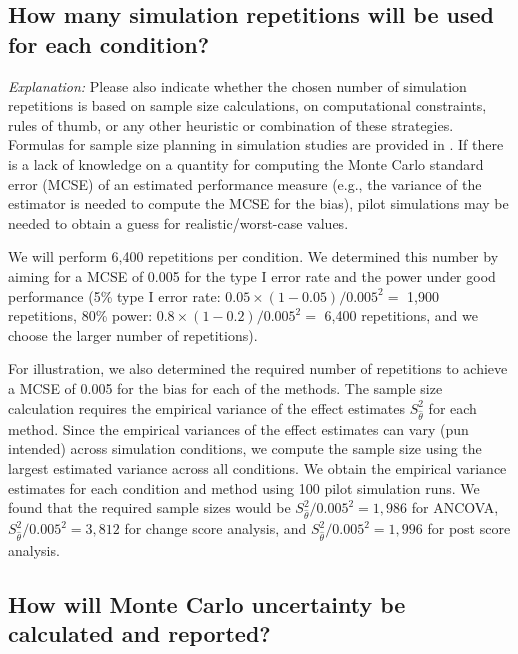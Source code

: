 \documentclass[12pt]{article}
\begin{document}
   
\subsection{How many simulation repetitions will be used for each condition?}  

\textit{Explanation:} Please also indicate whether the chosen number of simulation repetitions is based on sample size calculations, on computational constraints, rules of thumb, or any other heuristic or combination of these strategies. Formulas for sample size planning in simulation studies are provided in \textcite{Siepe2023}. If there is a lack of knowledge on a quantity for computing the Monte Carlo standard error (MCSE) of an estimated performance measure (e.g., the variance of the estimator is needed to compute the MCSE for the bias), pilot simulations may be needed to obtain a guess for realistic/worst-case values. 
    
\begin{examplebox}
We will perform 6,400 repetitions per condition. We determined this number by aiming for a MCSE of 0.005 for the type I error rate and the power under good performance (5\% type I error rate: $0.05 \times (1 - 0.05) / 0.005^2 =$ 1,900 repetitions, 80\% power: $0.8 \times (1 - 0.2) / 0.005^2 =$ 6,400 repetitions, and we choose the larger number of repetitions).
    
For illustration, we also determined the required number of repetitions to achieve a MCSE of 0.005 for the bias for each of the methods. The sample size calculation requires the empirical variance of the effect estimates $S_{\hat{\theta}}^2$ for each method. Since the empirical variances of the effect estimates can vary (pun intended) across simulation conditions, we compute the sample size using the largest estimated variance across all conditions. We obtain the empirical variance estimates for each condition and method using 100 pilot simulation runs. We found that the required sample sizes would be $S_{\hat{\theta}}^2/0.005^2 = 1{,}986$ for ANCOVA, $S_{\hat{\theta}}^2/0.005^2 = 3{,}812$ for change score analysis, and $S_{\hat{\theta}}^2/0.005^2 = 1{,}996$ for post score analysis.
\end{examplebox}


\subsection{How will Monte Carlo uncertainty be calculated and reported?} 
    
\end{document}
